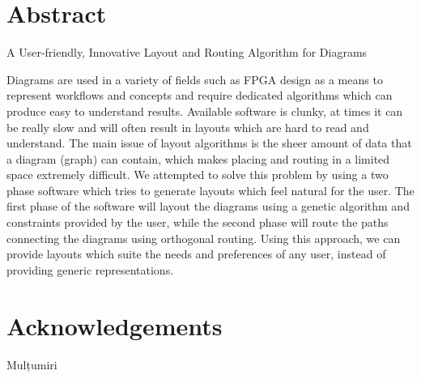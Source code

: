 \chapter*{Abstract}
A User-friendly, Innovative Layout and Routing Algorithm for Diagrams

Diagrams are used in a variety of fields such as FPGA design as a means to represent workflows and concepts and require dedicated algorithms which can produce easy to understand results. 
Available software is clunky, at times it can be really slow and will often result in layouts which are hard to read and understand. The main issue of layout algorithms is the sheer amount 
of data that a diagram (graph) can contain, which makes placing and routing in a limited space extremely difficult. We attempted to solve this problem by using a two phase software which tries 
to generate layouts which feel natural for the user. The first phase of the software will layout the diagrams using a genetic algorithm and constraints provided by the user, while the second 
phase will route the paths connecting the diagrams using orthogonal routing. Using this approach, we can provide layouts which suite the needs and preferences of any user, instead of providing 
generic representations.

\chapter*{Acknowledgements}

Mulțumiri 
